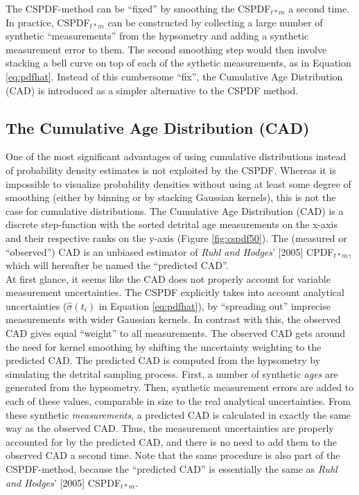 \documentclass[12pt,twoside]{article}
\begin{document}
The  CSPDF-method can be  ``fixed'' by  smoothing the  CSPDF$_{t*m}$ a
second  time.   In  practice,  CSPDF$_{t*m}$  can  be  constructed  by
collecting  a  large number  of  synthetic  ``measurements'' from  the
hypsometry  and adding  a synthetic  measurement error  to  them.  The
second smoothing step would then  involve stacking a bell curve on top
of each of the sythetic  measurements, as in Equation \ref{eq:pdfhat}. 
Instead of  this cumbersome  ``fix'', the Cumulative  Age Distribution
(CAD) is introduced as a simpler alternative to the CSPDF method.

\subsection{The Cumulative Age Distribution (CAD)} \label{sec:CAD}

One   of  the   most  significant   advantages  of   using  cumulative
distributions  instead   of  probability  density   estimates  is  not
exploited  by  the  CSPDF.   Whereas  it is  impossible  to  visualize
probability densities without using  at least some degree of smoothing
(either by binning  or by stacking Gaussian kernels),  this is not the
case  for cumulative distributions.   The Cumulative  Age Distribution
(CAD)  is  a  discrete  step-function  with the  sorted  detrital  age
measurements on  the x-axis and  their respective ranks on  the y-axis
(Figure \ref{fig:cspdf50}).  The (measured  or ``observed'') CAD is an
unbiased  estimator of  {\it  Ruhl and  Hodges}' [2005]  CPDF$_{t*m}$,
which will hereafter be named the ``predicted CAD''.
\\

At first glance,  it seems like the CAD does  not properly account for
variable measurement  uncertainties.  The CSPDF  explicitly takes into
account  analytical  uncertainties  ($\hat{\sigma}(t_i)$  in  Equation
\ref{eq:pdfhat}),  by ``spreading  out''  imprecise measurements  with
wider Gaussian kernels. In contrast  with this, the observed CAD gives
equal ``weight'' to all measurements. The observed CAD gets around the
need for kernel smoothing by shifting the uncertainty weighting to the
predicted CAD.  The  predicted CAD is computed from  the hypsometry by
simulating  the  detrital  sampling   process.   First,  a  number  of
synthetic  {\it  ages}  are  generated  from  the  hypsometry.   Then,
synthetic  measurement  errors are  added  to  each  of these  values,
comparable in  size to the real analytical  uncertainties.  From these
synthetic {\it measurements}, a predicted CAD is calculated in exactly
the same way as the observed CAD.  Thus, the measurement uncertainties
are properly accounted for by the  predicted CAD, and there is no need
to add  them to the  observed CAD a  second time.  Note that  the same
procedure is  also part of  the CSPDF-method, because  the ``predicted
CAD''  is  essentially the  same  as  {\it  Ruhl and  Hodges}'  [2005]
CSPDF$_{t*m}$.
\end{document}
